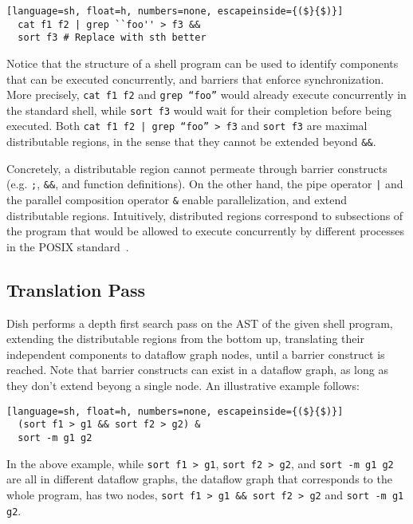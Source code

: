 \documentclass[sigplan,10pt,review,anonymous]{acmart}
\newcommand{\ttt}[1]{\texttt{\small #1}}
\newcommand{\tr}[1]{} %
\begin{document}
\begin{lstlisting}[language=sh, float=h, numbers=none, escapeinside={($}{$)}]
  cat f1 f2 | grep ``foo'' > f3 &&
  sort f3 # Replace with sth better
\end{lstlisting}

\noindent
Notice that the structure of a shell program can be used to identify
components that can be executed concurrently, and barriers that
enforce synchronization. More precisely, \ttt{cat f1 f2} and \ttt{grep
  ``foo''} would already execute concurrently in the standard shell,
while \ttt{sort f3} would wait for their completion before being
executed. Both \ttt{cat f1 f2 | grep ``foo'' > f3} and \ttt{sort f3}
are maximal distributable regions, in the sense that they cannot be
extended beyond \ttt{\&\&}.

Concretely, a distributable region cannot permeate through barrier
constructs (e.g. \ttt{;}, \ttt{\&\&}, and function definitions). On
the other hand, the pipe operator \ttt{|} and the parallel composition
operator \ttt{\&} enable parallelization, and extend distributable
regions. Intuitively, distributed regions correspond to subsections of
the program that would be allowed to execute concurrently by different
processes in the POSIX standard~\cite{posix}.

\tr{I don't know whether I should mention the following: While these
  control flow constructs can be parallelized and there has been
  research on it, it is orthogonal to our work, and can be
  incorporated as future work.}

\subsection{Translation Pass}

Dish performs a depth first search pass on the AST of the given shell
program, extending the distributable regions from the bottom up,
translating their independent components to dataflow graph
nodes, until a barrier construct is reached. Note that barrier
constructs can exist in a dataflow graph, as long as they don't
extend beyong a single node. An illustrative example follows:

\begin{lstlisting}[language=sh, float=h, numbers=none, escapeinside={($}{$)}]
  (sort f1 > g1 && sort f2 > g2) &
  sort -m g1 g2
\end{lstlisting}

In the above example, while \ttt{sort f1 > g1}, \ttt{sort f2 > g2},
and \ttt{sort -m g1 g2} are all in different dataflow graphs, the
dataflow graph that corresponds to the whole program, has two nodes,
\ttt{sort f1 > g1 \&\& sort f2 > g2} and \ttt{sort -m g1 g2}.
\end{document}
